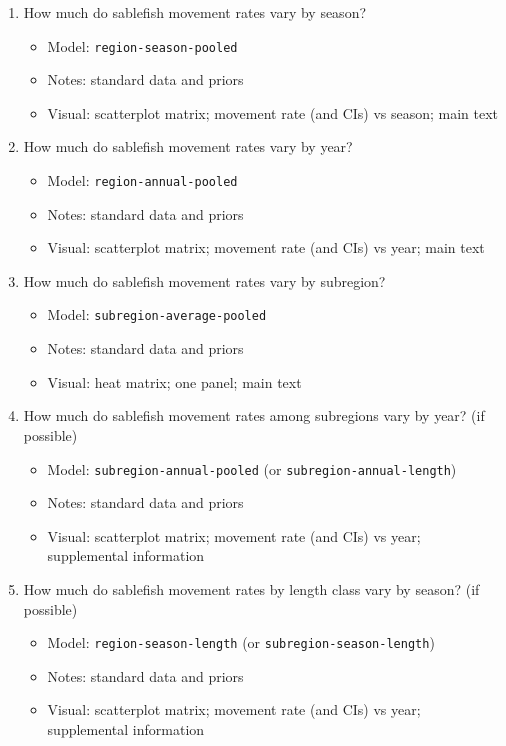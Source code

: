 \documentclass{article}
\begin{document}
\begin{enumerate}
    \item How much do sablefish movement rates vary by season?
    \begin{itemize}
        \item Model: \texttt{region-season-pooled}
        \item Notes: standard data and priors
        \item Visual: scatterplot matrix; movement rate (and CIs) vs season; main text
    \end{itemize}
    \item How much do sablefish movement rates vary by year?
    \begin{itemize}
        \item Model: \texttt{region-annual-pooled}
        \item Notes: standard data and priors
        \item Visual: scatterplot matrix; movement rate (and CIs) vs year; main text
    \end{itemize}
    \item How much do sablefish movement rates vary by subregion?
    \begin{itemize}
        \item Model: \texttt{subregion-average-pooled}
        \item Notes: standard data and priors
        \item Visual: heat matrix; one panel; main text
    \end{itemize}
    \item How much do sablefish movement rates among subregions vary by year? (if possible)
    \begin{itemize}
        \item Model: \texttt{subregion-annual-pooled} (or \texttt{subregion-annual-length})
        \item Notes: standard data and priors
        \item Visual: scatterplot matrix; movement rate (and CIs) vs year; supplemental information
    \end{itemize}
    \item How much do sablefish movement rates by length class vary by season? (if possible)
    \begin{itemize}
        \item Model: \texttt{region-season-length} (or \texttt{subregion-season-length})
        \item Notes: standard data and priors
        \item Visual: scatterplot matrix; movement rate (and CIs) vs year; supplemental information

\end{itemize}
\end{enumerate}
\end{document}
